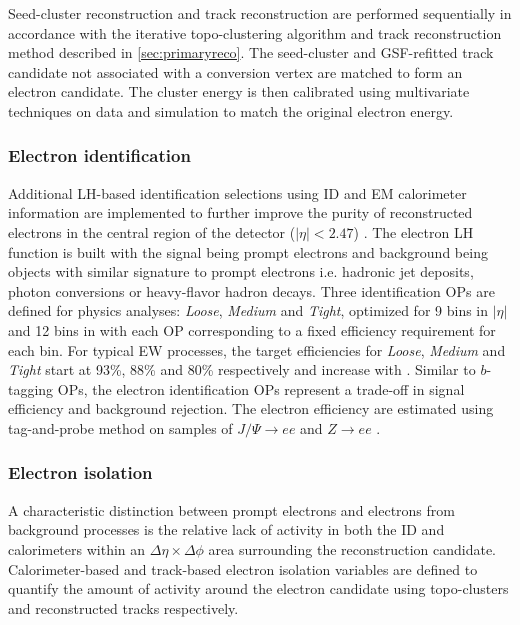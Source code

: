 \documentclass[../thesis.tex]{subfiles}
\begin{document}
Seed-cluster reconstruction and track reconstruction are performed sequentially in accordance with the iterative topo-clustering algorithm and track reconstruction method described in \autoref{sec:primaryreco}. The seed-cluster and \acs{GSF}-refitted track candidate not associated with a conversion vertex are matched to form an electron candidate. The cluster energy is then calibrated using multivariate techniques on data and simulation to match the original electron energy.

\subsubsection*{Electron identification}
Additional \acs{LH}-based identification selections using \acs{ID} and \acs{EM} calorimeter information are implemented to further improve the purity of reconstructed electrons in the central region of the detector ($|\eta|<2.47$) \citep{reco:electron_id}. The electron \acs{LH} function is built with the signal being prompt electrons and background being objects with similar signature to prompt electrons i.e. hadronic jet deposits, photon conversions or heavy-flavor hadron decays. Three identification \acs{OP}s are defined for physics analyses: \textit{Loose}, \textit{Medium} and \textit{Tight}, optimized for 9 bins in $|\eta|$ and 12 bins in \ET with each \acs{OP} corresponding to a fixed efficiency requirement for each bin. For typical \acs{EW} processes, the target efficiencies for \textit{Loose}, \textit{Medium} and \textit{Tight} start at 93\%, 88\% and 80\% respectively and increase with \ET. Similar to $b$-tagging \acs{OP}s, the electron identification {OP}s represent a trade-off in signal efficiency and background rejection. The electron efficiency are estimated using tag-and-probe method on samples of $J/\Psi \rightarrow ee$ and $Z \rightarrow ee$ \citep{reco:electron_id}.

\subsubsection*{Electron isolation}
\label{sec:eiso}
A characteristic distinction between prompt electrons and electrons from background processes is the relative lack of activity in both the \acs{ID} and calorimeters within an $\Delta \eta \times \Delta \phi$ area surrounding the reconstruction candidate. Calorimeter-based and track-based electron isolation variables \citep{reco:electron_id} are defined to quantify the amount of activity around the electron candidate using topo-clusters and reconstructed tracks respectively.
\end{document}
